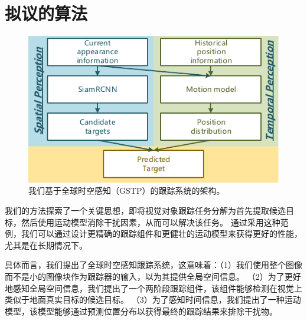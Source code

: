 \section{拟议的算法}
\label{sec:method}

\begin{figure}[t]
    \includegraphics{Img/globally/Arch7.pdf}
    \caption{我们基于全球时空感知（GSTP）的跟踪系统的架构。}
    \label{fig:arch}
\end{figure}

我们的方法探索了一个关键思想，即将视觉对象跟踪任务分解为首先提取候选目标，然后使用运动模型消除干扰因素，从而可以解决该任务。
通过采用这种范例，我们可以通过设计更精确的跟踪组件和更健壮的运动模型来获得更好的性能，尤其是在长期情况下。

具体而言，我们提出了全球时空感知跟踪系统，这意味着：（1）我们使用整个图像而不是小的图像块作为跟踪器的输入，以为其提供全局空间信息。 （2）为了更好地感知全局空间信息，我们提出了一个两阶段跟踪组件，该组件能够检测在视觉上类似于地面真实目标的候选目标。 （3）为了感知时间信息，我们提出了一种运动模型，该模型能够通过预测位置分布以获得最终的跟踪结果来排除干扰物。

